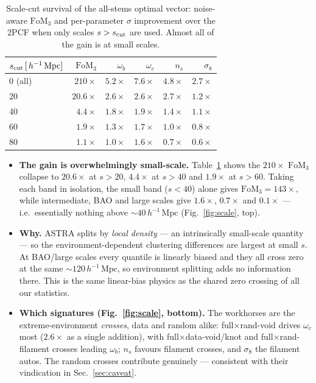 \documentclass[11pt]{article}
\newcommand{\Mpch}{\,h^{-1}\,\mathrm{Mpc}}
\newcommand{\FoM}{\mathrm{FoM}}
\begin{document}
\begin{table}[t]
\centering
\caption{Scale-cut survival of the all-stems optimal vector: noise-aware $\FoM_3$
and per-parameter $\sigma$ improvement over the 2PCF when only scales
$s>s_{\rm cut}$ are used.  Almost all of the gain is at small scales.}
\label{tab:scale}
\begin{tabular}{lrrrrr}
\toprule
$s_{\rm cut}\,[\Mpch]$ & $\FoM_3$ & $\omega_b$ & $\omega_c$ & $n_s$ & $\sigma_8$ \\
\midrule
0 (all) & $210\times$ & $5.2\times$ & $7.6\times$ & $4.8\times$ & $2.7\times$ \\
20      & $20.6\times$ & $2.6\times$ & $2.6\times$ & $2.7\times$ & $1.2\times$ \\
40      & $4.4\times$  & $1.8\times$ & $1.9\times$ & $1.4\times$ & $1.1\times$ \\
60      & $1.9\times$  & $1.3\times$ & $1.7\times$ & $1.0\times$ & $0.8\times$ \\
80      & $1.1\times$  & $1.0\times$ & $1.6\times$ & $0.7\times$ & $0.6\times$ \\
\bottomrule
\end{tabular}
\end{table}

\begin{itemize}
\item \textbf{The gain is overwhelmingly small-scale.}  Table~\ref{tab:scale}
  shows the $210\times$ $\FoM_3$ collapse to $20.6\times$ at $s>20$, $4.4\times$
  at $s>40$ and $1.9\times$ at $s>60$.  Taking each band in isolation, the small
  band ($s<40$) alone gives $\FoM_3=143\times$, while intermediate, BAO and large
  scales give $1.6\times$, $0.7\times$ and $0.1\times$ --- i.e.\ essentially
  nothing above $\sim\!40\Mpch$ (Fig.~\ref{fig:scale}, top).
\item \textbf{Why.}  ASTRA splits by \emph{local density} --- an intrinsically
  small-scale quantity --- so the environment-dependent clustering differences
  are largest at small $s$.  At BAO/large scales every quantile is linearly
  biased and they all cross zero at the same $\sim\!120\Mpch$, so environment
  splitting adds no information there.  This is the same linear-bias physics as
  the shared zero crossing of all our statistics.
\item \textbf{Which signatures (Fig.~\ref{fig:scale}, bottom).}  The workhorses
  are the extreme-environment \emph{crosses}, data and random alike:
  full$\times$rand-void drives $\omega_c$ most ($2.6\times$ as a single addition),
  with full$\times$data-void/knot and full$\times$rand-filament crosses leading
  $\omega_b$; $n_s$ favours filament crosses, and $\sigma_8$ the filament autos.
  The random crosses contribute genuinely --- consistent with their vindication
  in Sec.~\ref{sec:caveat}.
\end{itemize}
\end{document}
